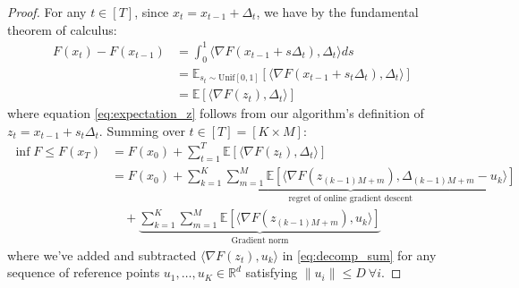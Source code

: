\documentclass[letterpaper]{article} %
\newcommand{\1}{\mathbf{1}}
\begin{document}
\convergence*
\begin{proof}
For any $t \in [T]$, since $x_t = x_{t-1} + \Delta_t$, we have by the fundamental theorem of calculus:
\begin{align}
F(x_t) - F(x_{t-1}) &= \int_0^1 \langle \nabla F(x_{t-1} + s\Delta_t), \Delta_t \rangle ds \label{eq:fund_thm}\\
&= \mathbb{E}_{s_t \sim \text{Unif}[0,1]}[\langle \nabla F(x_{t-1} + s_t\Delta_t), \Delta_t \rangle] \label{eq:expectation}\\
&= \mathbb{E}[\langle \nabla F(z_t), \Delta_t \rangle] \label{eq:expectation_z}
\end{align}
where equation \eqref{eq:expectation_z} follows from our algorithm's definition of $z_t = x_{t-1} + s_t\Delta_t$. Summing over $t \in [T] = [K \times M]$:
\begin{align}
\inf F \leq F(x_T) & =  F(x_0) + \sum_{t=1}^T \mathbb{E}[\langle \nabla F(z_t), \Delta_t \rangle] \label{eq:sum_ineq}\\
&= F(x_0) + \underbrace{\sum_{k=1}^K \sum_{m=1}^M \mathbb{E}[\langle \nabla F(z_{(k-1)M+m}), \Delta_{(k-1)M+m} - u_k \rangle]}_{\text{regret of online gradient descent}} \nonumber\\
&\quad + \underbrace{\sum_{k=1}^K \sum_{m=1}^M \mathbb{E}[\langle \nabla F(z_{(k-1)M+m}), u_k \rangle]}_{\text{Gradient norm}}\label{eq:decomp_sum}
\end{align}
where we've added and subtracted $\langle \nabla F(z_t), u_k \rangle$ in \eqref{eq:decomp_sum} for any sequence of reference points $u_1, \ldots, u_K \in \mathbb{R}^d$ satisfying $\| u_i \| \leq D ~\forall i$. 


\end{proof}
\end{document}
